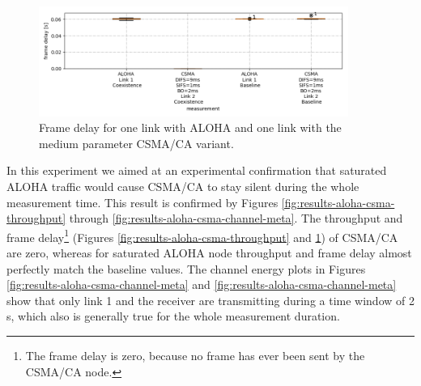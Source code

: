 \begin{figure}[tb]
	\label{fig:results-aloha-csma-frame-delay}
	\begin{center}
		\includegraphics[width=0.9\textwidth]{pictures/results/different_combinations/aloha_csma/frame_delay_boxplot}
	\end{center}
	\caption{Frame delay for one link with ALOHA and one link with the medium parameter CSMA/CA variant.}
\end{figure}

In this experiment we aimed at an experimental confirmation that saturated ALOHA traffic would cause CSMA/CA to stay silent during the whole measurement time. This result is confirmed by Figures \ref{fig:results-aloha-csma-throughput} through \ref{fig:results-aloha-csma-channel-meta}. The throughput and frame delay\footnote{The frame delay is zero, because no frame has ever been sent by the CSMA/CA node.} (Figures \ref{fig:results-aloha-csma-throughput} and \ref{fig:results-aloha-csma-frame-delay}) of CSMA/CA are zero, whereas for saturated ALOHA node throughput and frame delay almost perfectly match the baseline values. The channel energy plots in Figures \ref{fig:results-aloha-csma-channel-meta} and \ref{fig:results-aloha-csma-channel-meta} show that only link 1 and the receiver are transmitting during a time window of 2 s, which also is generally true for the whole measurement duration.

